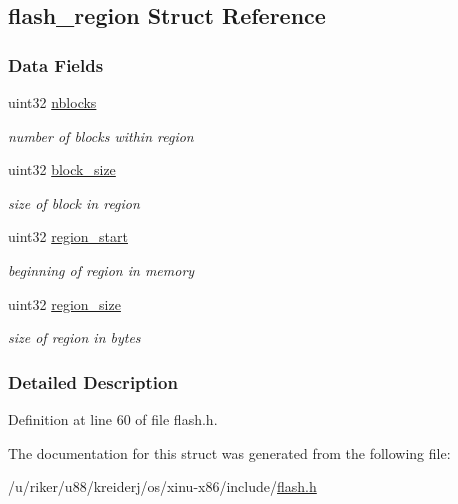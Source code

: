 \hypertarget{structflash__region}{}\subsection{flash\+\_\+region Struct Reference}
\label{structflash__region}
\subsubsection*{Data Fields}
\begin{DoxyCompactItemize}
\item 
\mbox{\label{structflash__region_af3a2ff2379c0b4531e59f12ffc6f7e80}} 
uint32 \hyperlink{structflash__region_af3a2ff2379c0b4531e59f12ffc6f7e80}{nblocks}
\begin{DoxyCompactList}\small\item\em number of blocks within region \end{DoxyCompactList}\item 
\mbox{\label{structflash__region_a16fc84a73f62f146fa581adcc4af207f}} 
uint32 \hyperlink{structflash__region_a16fc84a73f62f146fa581adcc4af207f}{block\+\_\+size}
\begin{DoxyCompactList}\small\item\em size of block in region \end{DoxyCompactList}\item 
\mbox{\label{structflash__region_a2b74becafafc235bc59895a3fe1c406b}} 
uint32 \hyperlink{structflash__region_a2b74becafafc235bc59895a3fe1c406b}{region\+\_\+start}
\begin{DoxyCompactList}\small\item\em beginning of region in memory \end{DoxyCompactList}\item 
\mbox{\label{structflash__region_ae51d64240eb4f4d668637712f31bc8c9}} 
uint32 \hyperlink{structflash__region_ae51d64240eb4f4d668637712f31bc8c9}{region\+\_\+size}
\begin{DoxyCompactList}\small\item\em size of region in bytes \end{DoxyCompactList}\end{DoxyCompactItemize}


\subsubsection{Detailed Description}


Definition at line 60 of file flash.\+h.



The documentation for this struct was generated from the following file\+:\begin{DoxyCompactItemize}
\item 
/u/riker/u88/kreiderj/os/xinu-\/x86/include/\hyperlink{flash_8h}{flash.\+h}\end{DoxyCompactItemize}
